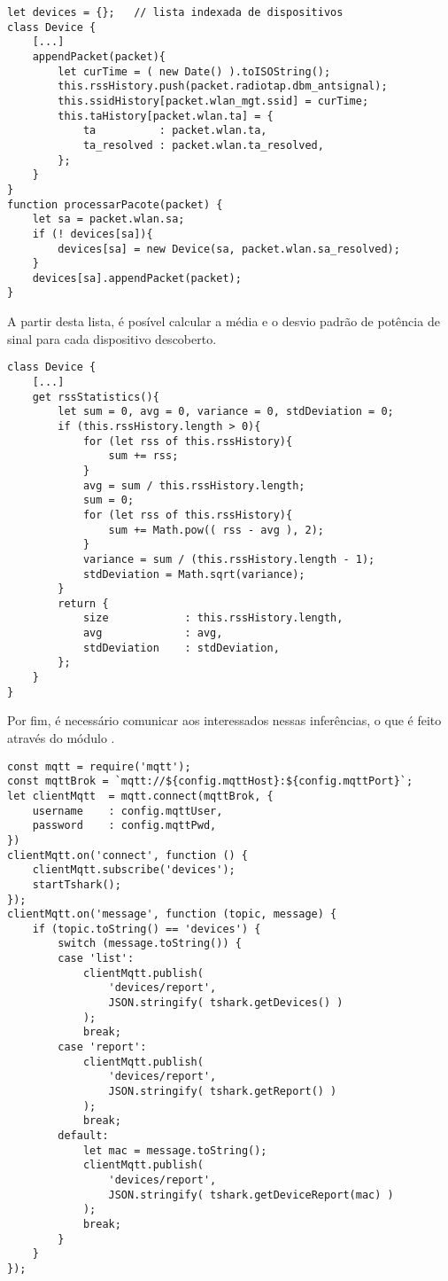 \begin{lstlisting}
let devices = {};	// lista indexada de dispositivos
class Device {
	[...]
	appendPacket(packet){
		let curTime = ( new Date() ).toISOString();
		this.rssHistory.push(packet.radiotap.dbm_antsignal);
		this.ssidHistory[packet.wlan_mgt.ssid] = curTime;
		this.taHistory[packet.wlan.ta] = {
			ta			: packet.wlan.ta,
			ta_resolved	: packet.wlan.ta_resolved,
		};
	}
}
function processarPacote(packet) {
	let sa = packet.wlan.sa;
	if (! devices[sa]){
		devices[sa] = new Device(sa, packet.wlan.sa_resolved);
	}
	devices[sa].appendPacket(packet);
}
\end{lstlisting}

A partir desta lista, é posível calcular a média e o desvio padrão de potência de
sinal para cada dispositivo descoberto.

\begin{lstlisting}
class Device {
	[...]
	get rssStatistics(){
		let sum = 0, avg = 0, variance = 0, stdDeviation = 0;
		if (this.rssHistory.length > 0){
			for (let rss of this.rssHistory){
				sum += rss;
			}
			avg = sum / this.rssHistory.length;
			sum = 0;
			for (let rss of this.rssHistory){
				sum += Math.pow(( rss - avg ), 2);
			}
			variance = sum / (this.rssHistory.length - 1);
			stdDeviation = Math.sqrt(variance);
		}
		return {
			size			: this.rssHistory.length,
			avg				: avg,
			stdDeviation	: stdDeviation,
		};
	}
}
\end{lstlisting}


Por fim, é necessário comunicar aos interessados nessas inferências, o que é
feito através do módulo .

\label{code-sensor-mqtt}
\begin{lstlisting}
const mqtt = require('mqtt');
const mqttBrok = `mqtt://${config.mqttHost}:${config.mqttPort}`;
let clientMqtt	= mqtt.connect(mqttBrok, {
	username	: config.mqttUser,
	password	: config.mqttPwd,
})
clientMqtt.on('connect', function () {
	clientMqtt.subscribe('devices');
	startTshark();
});
clientMqtt.on('message', function (topic, message) {
	if (topic.toString() == 'devices') {
		switch (message.toString()) {
		case 'list':
			clientMqtt.publish(
				'devices/report',
				JSON.stringify( tshark.getDevices() )
			);
			break;
		case 'report':
			clientMqtt.publish(
				'devices/report',
				JSON.stringify( tshark.getReport() )
			);
			break;
		default:
			let mac = message.toString();
			clientMqtt.publish(
				'devices/report',
				JSON.stringify( tshark.getDeviceReport(mac) )
			);
			break;
		}
	}
});
\end{lstlisting}

